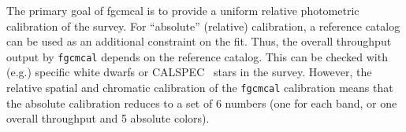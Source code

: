 The primary goal of fgcmcal is to provide a uniform relative photometric calibration of the survey.
For ``absolute'' (relative) calibration, a reference catalog can be used as an additional constraint on the fit.
Thus, the overall throughput output by \texttt{fgcmcal} depends on the reference catalog.
This can be checked with (e.g.) specific white dwarfs or CALSPEC~\citep{2007ASPC..364..315B} stars in the survey.
However, the relative spatial and chromatic calibration of the \texttt{fgcmcal} calibration means that the absolute calibration reduces to a set of 6 numbers (one for each band, or one overall throughput and 5 absolute colors).

